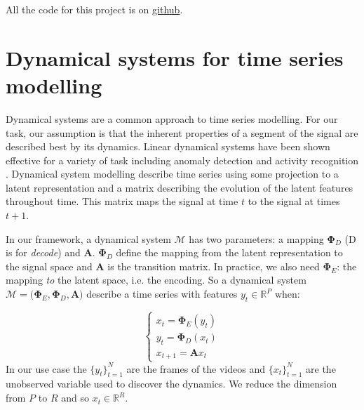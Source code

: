 \documentclass[twocolumn,10pt]{asme2ej}
\begin{document}
All the code for this project is on \href{https://github.com/JulesssG/tic-detection}{github}.

\section{Dynamical systems for time series modelling}
Dynamical systems are a common approach to time series modelling. For our task, our assumption is that the inherent properties of a segment of the signal are described best by its dynamics. Linear dynamical systems have been shown effective for a variety of task including anomaly detection and activity recognition \cite{zappella, doretto, smoke-detection-LDS}. Dynamical system modelling describe time series using some projection to a latent representation and a matrix describing the evolution of the latent features throughout time. This matrix maps the signal at time $t$ to the signal at times $t+1$.

In our framework, a dynamical system $\mathcal{M}$ has two parameters: a mapping $\bm \Phi_D$ (D is for \textit{decode}) and $\bm A$. $\bm \Phi_D$ define the mapping from the latent representation to the signal space and $\bm A$ is the transition matrix. In practice, we also need $\bm \Phi_E$: the mapping \emph{to} the latent space, i.e. the encoding. So a dynamical system $\mathcal{M} = \big(\bm \Phi_E, \bm \Phi_D, \bm A \big)$ describe a time series with features $y_t \in \mathbb{R}^P$ when:

\begin{equation}
    \begin{cases}
        x_t = \bm \Phi_E(y_t) \\
        y_t = \bm \Phi_D(x_t) \\
        x_{t+1} = \bm A x_t
    \end{cases}
\end{equation}
\noindent In our use case the $\{y_t\}_{t=1}^N$ are the frames of the videos and $\{x_t\}_{t=1}^N$ are the unobserved variable used to discover the dynamics. We reduce the dimension from $P$ to $R$ and so $x_t \in \mathbb{R}^R$.
\end{document}

